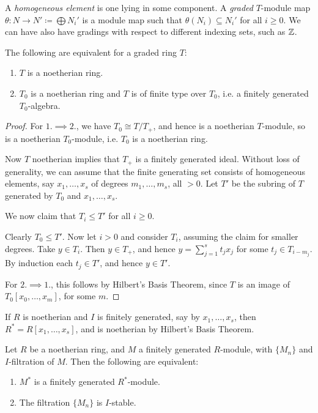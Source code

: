 \documentclass[10pt,a4paper]{article}
\begin{document}
A \emph{homogeneous element} is one lying in some component. A \emph{graded} $T$-module map $\theta: N \to N' \coloneqq \bigoplus N_i'$ is a module map such that $\theta(N_i) \subseteq N_i'$ for all $i \geq 0$. We can have also have gradings with respect to different indexing sets, such as $\mathbb{Z}$.

\begin{proposition}
  The following are equivalent for a graded ring $T$:
  \begin{enumerate}
    \item $T$ is a noetherian ring.
    \item $T_0$ is a noetherian ring and $T$ is of finite type over $T_0$, i.e. a finitely generated $T_0$-algebra.
  \end{enumerate}
\end{proposition}
\begin{proof}
  For $1. \implies 2.$, we have $T_0 \cong T/T_+$, and hence is a noetherian $T$-module, so is a noetherian $T_0$-module, i.e. $T_0$ is a noetherian ring.

  Now $T$ noetherian implies that $T_+$ is a finitely generated ideal. Without loss of generality, we can assume that the finite generating set consists of homogeneous elements, say $x_1, \ldots, x_s$ of degrees $m_1, \ldots, m_s$, all $>0$. Let $T'$ be the subring of $T$ generated by $T_0$ and $x_1, \ldots, x_s$.

  We now claim that $T_i \leq T'$ for all $i \geq 0$.

  Clearly $T_0 \leq T'$. Now let $i >0$ and consider $T_i$, assuming the claim for smaller degrees. Take $y \in T_i$. Then $y \in T_+$, and hence $y = \sum_{j=1}^s t_jx_j$ for some $t_j \in T_{i-m_j}$. By induction each $t_j \in T'$, and hence $y \in T'$.

  For $2. \implies 1.$, this follows by Hilbert's Basis Theorem, since $T$ is an image of $T_0[x_0, \ldots, x_m]$, for some $m$.
\end{proof}
If $R$ is noetherian and $I$ is finitely generated, say by $x_1, \ldots, x_s$, then $R^\ast = R[x_1, \ldots, x_s]$, and is noetherian by Hilbert's Basis Theorem.
\begin{lemma}
  Let $R$ be a noetherian ring, and $M$ a finitely generated $R$-module, with $\{M_n\}$ and $I$-filtration of $M$. Then the following are equivalent:
  \begin{enumerate}
    \item $M^\ast$ is a finitely generated $R^\ast$-module.
    \item The filtration $\{M_n\}$ is $I$-stable.
  \end{enumerate}
\end{lemma}
\end{document}
